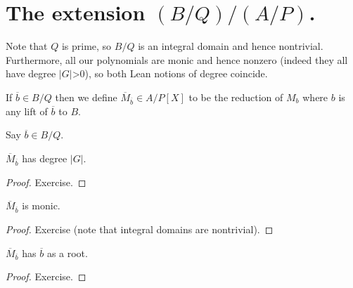 \section{The extension \texorpdfstring{$(B/Q)/(A/P)$}{(B/Q)/(A/P)}.}

Note that $Q$ is prime, so $B/Q$ is an integral domain and hence nontrivial.
Furthermore, all our polynomials are monic and hence nonzero (indeed they
all have degree $|G|$>0), so both Lean notions of degree coincide.

\begin{definition}
  \label{MulSemiringAction.CharacteristicPolynomial.Mbar}
  \leanok
  If $\overline{b}\in B/Q$ then we define $\overline{M}_{\overline{b}}\in A/P[X]$
  to be the reduction of $M_b$ where $b$ is any lift of $\overline{b}$ to $B$.
\end{definition}

Say $\overline{b}\in B/Q$.

\begin{theorem}
  \label{MulSemiringAction.CharacteristicPolynomial.Mbar_deg}
  \leanok
  $\overline{M}_{\overline{b}}$ has degree $|G|$.
\end{theorem}
\begin{proof}
  \leanok
  Exercise.
\end{proof}

\begin{theorem}
  \label{MulSemiringAction.CharacteristicPolynomial.Mbar_monic}
  \leanok
  $\overline{M}_{\overline{b}}$ is monic.
\end{theorem}
\begin{proof}
  \leanok
  Exercise (note that integral domains are nontrivial).
\end{proof}

\begin{theorem}
  \label{MulSemiringAction.CharacteristicPolynomial.Mbar_eval_eq_zero}
  \leanok
  $\overline{M}_{\overline{b}}$ has $\overline{b}$ as a root.
\end{theorem}
\begin{proof}
  \leanok
  Exercise.
\end{proof}


